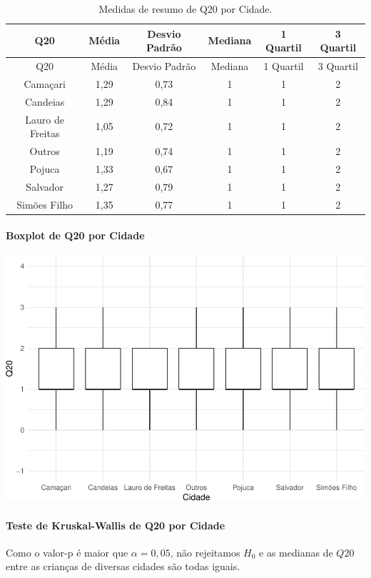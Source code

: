 \documentclass[]{article}
\let\oldparagraph\paragraph
\renewcommand{\paragraph}[1]{\oldparagraph{#1}\mbox{}}
\begin{document}
\begin{longtable}[]{@{}cccccc@{}}
\caption{\label{tab:unnamed-chunk-291}Medidas de resumo de Q20 por Cidade.}\tabularnewline
\toprule
Q20 & Média & Desvio Padrão & Mediana & 1 Quartil & 3 Quartil\tabularnewline
\midrule
\endfirsthead
\toprule
Q20 & Média & Desvio Padrão & Mediana & 1 Quartil & 3 Quartil\tabularnewline
\midrule
\endhead
Camaçari & 1,29 & 0,73 & 1 & 1 & 2\tabularnewline
Candeias & 1,29 & 0,84 & 1 & 1 & 2\tabularnewline
Lauro de Freitas & 1,05 & 0,72 & 1 & 1 & 2\tabularnewline
Outros & 1,19 & 0,74 & 1 & 1 & 2\tabularnewline
Pojuca & 1,33 & 0,67 & 1 & 1 & 2\tabularnewline
Salvador & 1,27 & 0,79 & 1 & 1 & 2\tabularnewline
Simões Filho & 1,35 & 0,77 & 1 & 1 & 2\tabularnewline
\bottomrule
\end{longtable}

\hypertarget{boxplot-de-q20-por-cidade}{%
\paragraph{Boxplot de Q20 por Cidade}\label{boxplot-de-q20-por-cidade}}

\begin{center}\includegraphics[width=0.75\linewidth]{relatorio_files/figure-latex/unnamed-chunk-292-1} \end{center}

\hypertarget{teste-de-kruskal-wallis-de-q20-por-cidade}{%
\paragraph{Teste de Kruskal-Wallis de Q20 por Cidade}\label{teste-de-kruskal-wallis-de-q20-por-cidade}}

Como o valor-p é maior que \(\alpha=0,05\), não rejeitamos \(H_0\) e as medianas de \(Q20\) entre as crianças de diversas cidades são todas iguais.
\end{document}
